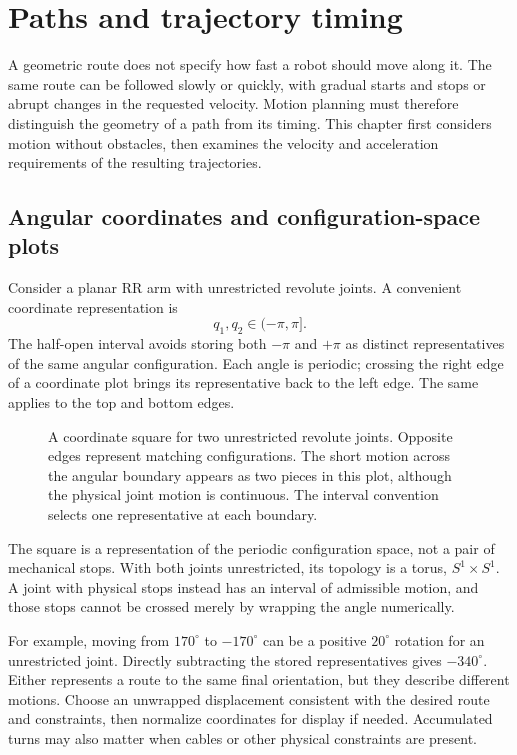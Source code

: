 \chapter{Paths and trajectory timing}
\label{chap:lecture12}
A geometric route does not specify how fast a robot should move along it.
The same route can be followed slowly or quickly, with gradual starts and
stops or abrupt changes in the requested velocity. Motion planning must
therefore distinguish the geometry of a path from its timing. This chapter
first considers motion without obstacles, then examines the velocity and
acceleration requirements of the resulting trajectories.

\section{Angular coordinates and configuration-space plots}
Consider a planar RR arm with unrestricted revolute joints. A convenient
coordinate representation is
\[
 q_1,q_2\in(-\pi,\pi].
\]
The half-open interval avoids storing both $-\pi$ and $+\pi$ as distinct
representatives of the same angular configuration. Each angle is periodic;
crossing the right edge of a coordinate plot brings its representative
back to the left edge. The same applies to the top and bottom edges.

\begin{figure}[htbp]
\centering
\caption{A coordinate square for two unrestricted revolute joints.
Opposite edges represent matching configurations. The short motion across
the angular boundary appears as two pieces in this plot, although the
physical joint motion is continuous. The interval convention selects one
representative at each boundary.}
\label{fig:l12-periodic}
\end{figure}

The square is a representation of the periodic configuration space, not
a pair of mechanical stops. With both joints unrestricted, its topology
is a torus, $S^1\times S^1$. A joint with physical stops instead has an
interval of admissible motion, and those stops cannot be crossed merely
by wrapping the angle numerically.

For example, moving from $170^\circ$ to $-170^\circ$ can be a positive
$20^\circ$ rotation for an unrestricted joint. Directly subtracting the
stored representatives gives $-340^\circ$. Either represents a route to
the same final orientation, but they describe different motions. Choose
an unwrapped displacement consistent with the desired route and constraints,
then normalize coordinates for display if needed. Accumulated turns may
also matter when cables or other physical constraints are present.

